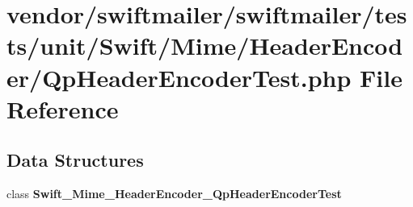 \section{vendor/swiftmailer/swiftmailer/tests/unit/\+Swift/\+Mime/\+Header\+Encoder/\+Qp\+Header\+Encoder\+Test.php File Reference}
\label{_qp_header_encoder_test_8php}
\subsection*{Data Structures}
\begin{DoxyCompactItemize}
\item 
class {\bf Swift\+\_\+\+Mime\+\_\+\+Header\+Encoder\+\_\+\+Qp\+Header\+Encoder\+Test}
\end{DoxyCompactItemize}
